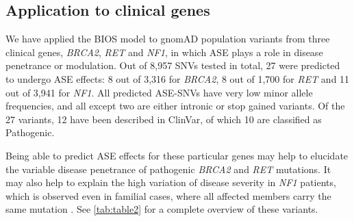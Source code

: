 \documentclass{book}
\begin{document}
\begin{refsection}
\subsection*{Application to clinical genes}
We have applied the BIOS model to gnomAD population variants from three clinical genes, \textit{BRCA2}, \textit{RET} and \textit{NF1}, in which ASE plays a role in disease penetrance or modulation.
Out of 8,957 SNVs tested in total, 27 were predicted to undergo ASE effects: 8 out of 3,316 for \textit{BRCA2}, 8 out of 1,700 for \textit{RET} and 11 out of 3,941 for \textit{NF1}.
All predicted ASE-SNVs have very low minor allele frequencies, and all except two are either intronic or stop gained variants.
Of the 27 variants, 12 have been described in ClinVar, of which 10 are classified as Pathogenic.

Being able to predict ASE effects for these particular genes may help to elucidate the variable disease penetrance of pathogenic \textit{BRCA2} \cite{Maia2012Effects} and \textit{RET} \cite{Emison2010Differential} mutations.
It may also help to explain the high variation of disease severity in \textit{NF1} patients, which is observed even in familial cases, where all affected members carry the same mutation \cite{Jentarra2011Skewed}.
See \ref{tab:table2} for a complete overview of these variants.



\end{refsection}
\end{document}
